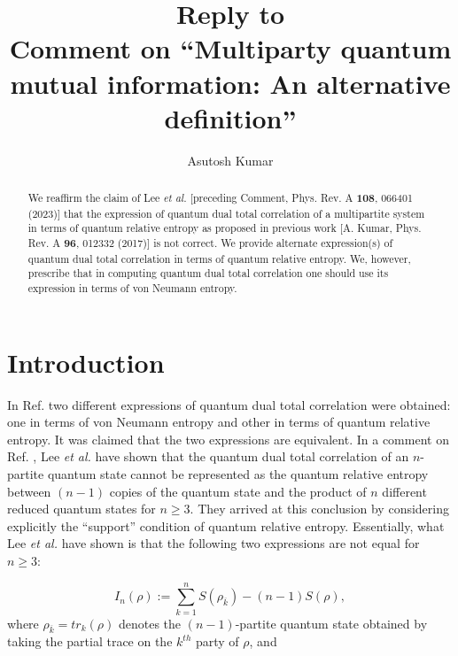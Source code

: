 \documentclass[aps,onecolumn,qic,superscriptaddress,11pt]{revtex4-1}
\begin{document}
\pagestyle{empty}


\title{Reply to \\ Comment on ``Multiparty quantum mutual information: An
alternative definition''}

 
\author{Asutosh Kumar}



\begin{abstract}
We reaffirm the claim of Lee {\it et al.} [preceding Comment, Phys. Rev. A {\bf 108}, 066401 (2023)] that the expression of quantum dual total correlation of a multipartite system in terms of quantum relative entropy as proposed in previous work [A. Kumar, Phys. Rev. A {\bf 96}, 012332 (2017)] is not correct. We provide alternate expression(s) of quantum dual total correlation in terms of quantum relative entropy. We, however, prescribe that in computing quantum dual total correlation one should use its expression in terms of von Neumann entropy.  
\end{abstract}

\maketitle

\section{Introduction}
In Ref. \cite{asu-qmi} two different expressions of quantum dual total correlation were obtained: one in terms of von Neumann entropy and other in terms of quantum relative entropy. It was claimed that the two expressions are equivalent.
In a comment \cite{lee} on Ref. \cite{asu-qmi}, Lee {\it et al.} have shown that the quantum dual total correlation of an $n$-partite quantum state cannot be represented as the quantum relative entropy between $(n - 1)$ copies of the quantum state and the product of $n$ different reduced quantum states for $n \ge 3$.
They arrived at this conclusion by considering explicitly the ``support'' condition of quantum relative entropy. 
Essentially, what Lee {\it et al.} have shown is that the following two expressions are not equal for $n \ge 3$:

\begin{equation} \label{vn-ent}
I_n(\rho) := \sum^n_{k=1} S(\rho_{\overline{k}}) - (n-1) S(\rho),
\end{equation}
where $\rho_{\overline{k}} = tr_k (\rho)$ denotes the $(n-1)$-partite quantum state obtained by taking the partial trace on the $k^{th}$ party of $\rho$, and 
\end{document}
